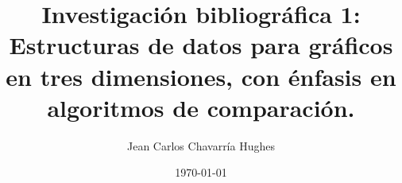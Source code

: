 \documentclass{beamer}
\title[Formatos 3D]{{\tiny Investigación bibliográfica 1:}\\ Estructuras de datos para gr\' aficos en tres dimensiones, con \' enfasis en algoritmos de comparaci\' on.} %
\author{Jean Carlos Chavarr\' ia Hughes} %
\institute[UCR] %
{
Universdad de Costa Rica \\ %
\medskip
\textit{jeancarlos.chavarria@ucr.ac.cr} %
}
\date{\today} %
\begin{document}
\begin{frame}
\titlepage %
\end{frame}



\end{document}
